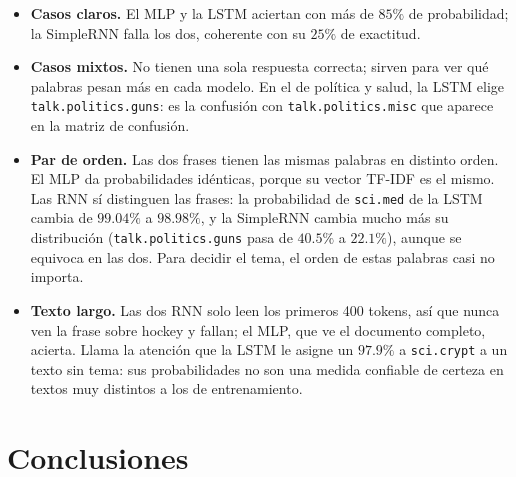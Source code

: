 \documentclass[12pt, a4paper]{article}
\newcommand{\clase}[1]{\nolinkurl{#1}}
\begin{document}
\begin{itemize}
    \item \textbf{Casos claros.} El MLP y la LSTM aciertan con más de $85\%$ de probabilidad; la SimpleRNN falla los dos, coherente con su $25\%$ de exactitud.
    \item \textbf{Casos mixtos.} No tienen una sola respuesta correcta; sirven para ver qué palabras pesan más en cada modelo. En el de política y salud, la LSTM elige \clase{talk.politics.guns}: es la confusión con \clase{talk.politics.misc} que aparece en la matriz de confusión.
    \item \textbf{Par de orden.} Las dos frases tienen las mismas palabras en distinto orden. El MLP da probabilidades idénticas, porque su vector TF-IDF es el mismo. Las RNN sí distinguen las frases: la probabilidad de \clase{sci.med} de la LSTM cambia de $99.04\%$ a $98.98\%$, y la SimpleRNN cambia mucho más su distribución (\clase{talk.politics.guns} pasa de $40.5\%$ a $22.1\%$), aunque se equivoca en las dos. Para decidir el tema, el orden de estas palabras casi no importa.
    \item \textbf{Texto largo.} Las dos RNN solo leen los primeros 400 tokens, así que nunca ven la frase sobre hockey y fallan; el MLP, que ve el documento completo, acierta. Llama la atención que la LSTM le asigne un $97.9\%$ a \clase{sci.crypt} a un texto sin tema: sus probabilidades no son una medida confiable de certeza en textos muy distintos a los de entrenamiento.
\end{itemize}

\section{Conclusiones}\label{sec:conclusiones}
\end{document}
